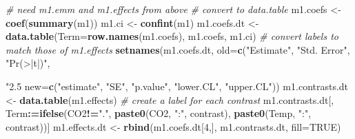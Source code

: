 \documentclass[]{book}
\newenvironment{Shaded}{\begin{snugshade}}{\end{snugshade}}
\newcommand{\CommentTok}[1]{\textcolor[rgb]{0.56,0.35,0.01}{\textit{#1}}}
\newcommand{\DataTypeTok}[1]{\textcolor[rgb]{0.13,0.29,0.53}{#1}}
\newcommand{\DecValTok}[1]{\textcolor[rgb]{0.00,0.00,0.81}{#1}}
\newcommand{\ErrorTok}[1]{\textcolor[rgb]{0.64,0.00,0.00}{\textbf{#1}}}
\newcommand{\KeywordTok}[1]{\textcolor[rgb]{0.13,0.29,0.53}{\textbf{#1}}}
\newcommand{\NormalTok}[1]{#1}
\newcommand{\OperatorTok}[1]{\textcolor[rgb]{0.81,0.36,0.00}{\textbf{#1}}}
\newcommand{\OtherTok}[1]{\textcolor[rgb]{0.56,0.35,0.01}{#1}}
\newcommand{\StringTok}[1]{\textcolor[rgb]{0.31,0.60,0.02}{#1}}
\begin{document}
\begin{Shaded}
\begin{Highlighting}[]
\CommentTok{# need m1.emm and m1.effects from above}
\CommentTok{# convert to data.table}
\NormalTok{m1.coefs <-}\StringTok{ }\KeywordTok{coef}\NormalTok{(}\KeywordTok{summary}\NormalTok{(m1))}
\NormalTok{m1.ci <-}\StringTok{ }\KeywordTok{confint}\NormalTok{(m1)}
\NormalTok{m1.coefs.dt <-}\StringTok{ }\KeywordTok{data.table}\NormalTok{(}\DataTypeTok{Term=}\KeywordTok{row.names}\NormalTok{(m1.coefs), m1.coefs, m1.ci)}
\CommentTok{# convert labels to match those of m1.effects}
\KeywordTok{setnames}\NormalTok{(m1.coefs.dt, }
         \DataTypeTok{old=}\KeywordTok{c}\NormalTok{(}\StringTok{"Estimate"}\NormalTok{, }\StringTok{"Std. Error"}\NormalTok{, }\StringTok{"Pr(>|t|)"}\NormalTok{, }\StringTok{"2.5 %
         \DataTypeTok{new=}\KeywordTok{c}\NormalTok{(}\StringTok{"estimate"}\NormalTok{, }\StringTok{"SE"}\NormalTok{, }\StringTok{"p.value"}\NormalTok{, }\StringTok{"lower.CL"}\NormalTok{, }\StringTok{"upper.CL"}\NormalTok{))}
\NormalTok{m1.contrasts.dt <-}\StringTok{ }\KeywordTok{data.table}\NormalTok{(m1.effects)}
\CommentTok{# create a label for each contrast}
\NormalTok{m1.contrasts.dt[, Term}\OperatorTok{:}\ErrorTok{=}\KeywordTok{ifelse}\NormalTok{(CO2}\OperatorTok{!=}\StringTok{"."}\NormalTok{, }
                              \KeywordTok{paste0}\NormalTok{(CO2, }\StringTok{":"}\NormalTok{, contrast), }
                              \KeywordTok{paste0}\NormalTok{(Temp, }\StringTok{":"}\NormalTok{, contrast))]}
\NormalTok{m1.effects.dt <-}\StringTok{ }\KeywordTok{rbind}\NormalTok{(m1.coefs.dt[}\DecValTok{4}\NormalTok{,], m1.contrasts.dt, }\DataTypeTok{fill=}\OtherTok{TRUE}\NormalTok{)}

}
\end{Highlighting}
\end{Shaded}
\end{document}
